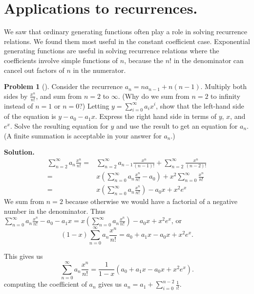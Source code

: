 \documentclass[10pt,]{book}
\theoremstyle{plain}
\theoremstyle{definition}
\newtheorem{activity}[project]{Problem}
\theoremstyle{definition}
\numberwithin{equation}{chapter}
\newcommand{\amp}{&}
\begin{document}
\section[{Applications to recurrences.}]{Applications to recurrences.}\label{section-24}
We saw that ordinary generating functions often play a role in solving recurrence relations. We found them most useful in the constant coefficient case. Exponential generating functions are useful in solving recurrence relations where the coefficients involve simple functions of \(n\), because the \(n!\) in the denominator can cancel out factors of \(n\) in the numerator.%
\begin{activity}[]\label{activity-384}
Consider the recurrence \(a_n=na_{n-1} +n(n-1)\). Multiply both sides by \(\frac{x^n}{n!}\), and sum from \(n=2\) to \(\infty\). (Why do we sum from \(n=2\) to infinity instead of \(n=1\) or \(n=0\)?) Letting \(y =
\sum_{i=0}^\infty a_ix^i\), show that the left-hand side of the equation is \(y-a_0 -a_1x\). Express the right hand side in terms of \(y\), \(x\), and \(e^x\). Solve the resulting equation for \(y\) and use the result to get an equation for \(a_n\). (A finite summation is acceptable in your answer for \(a_n\).)%
\par\medskip\noindent%
\textbf{Solution.}\quad %
\begin{align*}
\sum_{n=2}^\infty a_n\frac{x^n}{n!}
=\amp \sum_{n=2}^\infty a_{n-1}\frac{x^n}{(n-1)!} + \sum_{n=2}^\infty
\frac{x^n}{(n-2)!}\\
=\amp  x\left(\sum_{n=0}^\infty a_n\frac{x^n}{n!} - a_0\right) +
x^2\sum_{n=0}^\infty \frac{x^n}{n!}\\
=\amp  x\left(\sum_{n=0}^\infty a_n\frac{x^n}{n!}\right) - a_0x
+x^2e^x
\end{align*}
We sum from \(n=2\) because otherwise we would have a factorial of a negative number in the denominator. Thus \(\sum_{n=0}^\infty a_n\frac{x^n}{n!} -a_0-a_1x =  x\left(\sum_{n=0}^\infty a_n\frac{x^n}{n!}\right) - a_0x
+x^2e^x\), or%
\begin{equation*}
(1-x)\sum_{n=0}^\infty a_n\frac{x^n}{n!}=a_0+a_1x-a_0x +x^2e^x.
\end{equation*}
%
\par
This gives us%
\begin{equation*}
\sum_{n=0}^\infty a_n\frac{x^n}{n!}=\frac{1}{1-x}(a_0+a_1x-a_0x
+x^2e^x).
\end{equation*}
computing the coefficient of \(a_n\) gives us \(a_n = a_1 +\sum_{i=0}^{n-2}
\frac{1}{i!}\).%
\end{activity}
\end{document}

